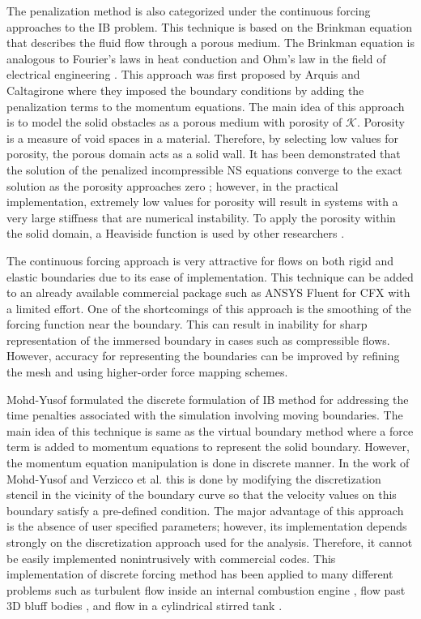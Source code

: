 The penalization method is also categorized under the continuous forcing approaches to the IB problem. This technique is based on the Brinkman equation that describes the fluid flow through a porous medium. The Brinkman equation is analogous to Fourier's laws in heat conduction and Ohm's law in the field of electrical engineering \cite{durlofsky1987analysis}. This approach was first proposed by Arquis and Caltagirone \cite{arquis1984conditions} where they imposed the boundary conditions by adding the penalization terms to the momentum equations. The main idea of this approach is to model the solid obstacles as a porous medium with porosity of $\mathcal{K}$. Porosity is a measure of void spaces in a material. Therefore, by selecting low values for porosity, the porous domain acts as a solid wall. It has been demonstrated that the solution of the penalized incompressible NS equations converge to the exact solution as the porosity approaches zero \cite{angot1999analysis}; however, in the practical implementation, extremely low values for porosity will result in systems with a very large stiffness that are numerical instability. To apply the porosity within the solid domain, a Heaviside function is used by other researchers \cite{gazzola2011simulations, kevlahan2001computation}.

The continuous forcing approach is very attractive for flows on both rigid and elastic boundaries due to its ease of implementation. This technique can be added to an already available commercial package such as ANSYS Fluent for CFX with a limited effort. One of the shortcomings of this approach is the smoothing of the forcing function near the boundary. This can result in inability for sharp representation of the immersed boundary in cases such as compressible flows. However, accuracy for representing the boundaries can be improved by refining the mesh and using higher-order force mapping schemes.

Mohd-Yusof formulated the discrete formulation of IB method \cite{mohd1997combined} for addressing the time penalties associated with the simulation involving moving boundaries. The main idea of this technique is same as the virtual boundary method where a force term is added to momentum equations to represent the solid boundary. However, the momentum equation manipulation is done in discrete manner. In the work of Mohd-Yusof \cite{mohd1997combined} and Verzicco et al. \cite{verzicco1998complex} this is done by modifying the discretization stencil in the vicinity of the boundary curve so that the velocity values on this boundary satisfy a pre-defined condition. The major advantage of this approach is the absence of user specified parameters; however, its implementation depends strongly on the discretization approach used for the analysis. Therefore, it cannot be easily implemented nonintrusively with commercial codes. This implementation of discrete forcing method has been applied to many different problems such as turbulent flow inside an internal combustion engine \cite{verzicco1998complex}, flow past 3D bluff bodies \cite{verzicco2002large}, and flow in a cylindrical stirred tank \cite{iaccarino2003immersed}.

